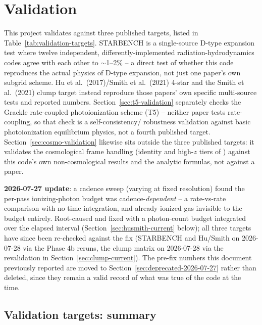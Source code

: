 \section{Validation}
\label{sec:validation}

This project validates against three published targets, listed in
Table~\ref{tab:validation-targets}. STARBENCH \citep{Bisbas2015} is a
single-source D-type expansion test where twelve independent,
differently-implemented radiation-hydrodynamics codes agree with each
other to $\sim$1--2\% -- a direct test of whether this code reproduces
the actual physics of D-type expansion, not just one paper's own
subgrid scheme. Hu et al.\ (2017)/Smith et al.\ (2021) 4-star and the
Smith et al.\ (2021) clump target instead reproduce those papers' own
specific multi-source tests and reported numbers. Section~\ref{sec:t5-validation}
separately checks the Grackle rate-coupled photoionization scheme (T5) --
neither paper tests rate-coupling, so that check is a self-consistency/
robustness validation against basic photoionization equilibrium physics,
not a fourth published target. Section~\ref{sec:cosmo-validation}
likewise sits outside the three published targets: it validates the
cosmological frame handling (identity and high-$z$ tiers of
) against this code's own non-cosmological
results and the analytic formulas, not against a paper.

\textbf{2026-07-27 update}: a cadence sweep (varying
 at fixed resolution) found the
per-pass ionizing-photon budget was cadence-\emph{dependent} -- a
rate-vs-rate comparison with no time integration, and already-ionized gas
invisible to the budget entirely. Root-caused and fixed with a photon-count
budget integrated over the elapsed interval (Section~\ref{sec:husmith-current}
below); all three targets have since been re-checked against the fix
(STARBENCH and Hu/Smith on 2026-07-28 via the Phase 4b reruns, the
clump matrix on 2026-07-28 via the revalidation in
Section~\ref{sec:clump-current}). The pre-fix numbers this document
previously reported are moved to
Section~\ref{sec:deprecated-2026-07-27} rather than deleted, since they
remain a valid record of what was true of the code at the time.

\subsection{Validation targets: summary}
\label{sec:validation-targets}

